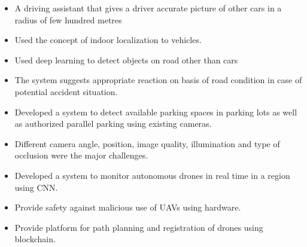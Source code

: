 \begin{itemize}
\item A driving assistant that gives a driver accurate picture of other cars in a radius of few hundred metres
\item Used the concept of indoor localization to vehicles.
\item Used deep learning to detect objects on road other than cars
\item The system suggests appropriate reaction on basis of road condition in case of potential accident situation.
\end{itemize}


\smallskip
\smallskip


\begin{itemize}
\item Developed a system to detect available parking spaces in parking lots as well as authorized parallel parking using existing cameras.
\item Different camera angle, position, image quality, illumination and type of occlusion were the major challenges.
\end{itemize}

\smallskip
\smallskip

\begin{itemize}
\item Developed a system to monitor autonomous drones in real time in a region using CNN.
\item Provide safety against malicious use of UAVs using hardware.
\item Provide platform for path planning and registration of drones using blockchain. 
\end{itemize}

\cvproject{}